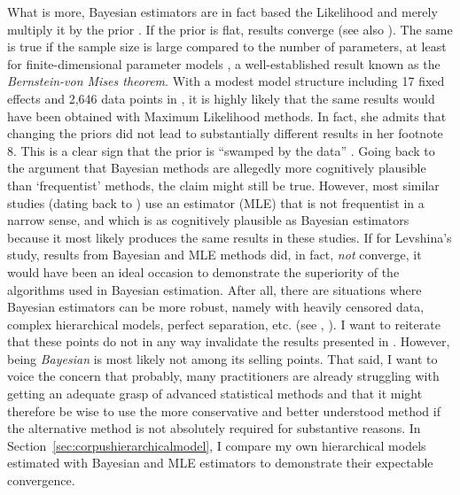 \documentclass[USenglish]{article}
\begin{document}
What is more, Bayesian estimators are in fact based the Likelihood and merely multiply it by the prior \citep[6--8]{GelmanEa2014}.
If the prior is flat, results converge (see also \citealp[347]{GelmanHill2006}).
The same is true if the sample size is large compared to the number of parameters, at least for finite-dimensional parameter models \citep[1119--1120]{Freedman1999}, a well-established result known as the \textit{Bernstein-von Mises theorem}.
With a modest model structure including 17 fixed effects and 2,646 data points in \cite{Levshina2016}, it is highly likely that the same results would have been obtained with Maximum Likelihood methods.
In fact, she admits that changing the priors did not lead to substantially different results in her footnote 8.
This is a clear sign that the prior is ``swamped by the data'' \citep[1119]{Freedman1999}.
Going back to the argument that Bayesian methods are allegedly more cognitively plausible than `frequentist' methods, the claim might still be true.
However, most similar studies (dating back to \citealp{BresnanEa2007}) use an estimator (MLE) that is not frequentist in a narrow sense, and which is as cognitively plausible as Bayesian estimators because it most likely produces the same results in these studies.
If for Levshina's study, results from Bayesian and MLE methods did, in fact, \textit{not} converge, it would have been an ideal occasion to demonstrate the superiority of the algorithms used in Bayesian estimation.
After all, there are situations where Bayesian estimators can be more robust, namely with heavily censored data, complex hierarchical models, perfect separation, etc. (see \citealp{Freedman1999}, \citealp[345--348]{GelmanHill2006}).
I want to reiterate that these points do not in any way invalidate the results presented in \cite{Levshina2016}.
However, being \textit{Bayesian} is most likely not among its selling points.
That said, I want to voice the concern that probably, many practitioners are already struggling with getting an adequate grasp of advanced statistical methods and that it might therefore be wise to use the more conservative and better understood method if the alternative method is not absolutely required for substantive reasons.
In Section~\ref{sec:corpushierarchicalmodel}, I compare my own hierarchical models estimated with Bayesian and MLE estimators to demonstrate their expectable convergence.


\end{document}
